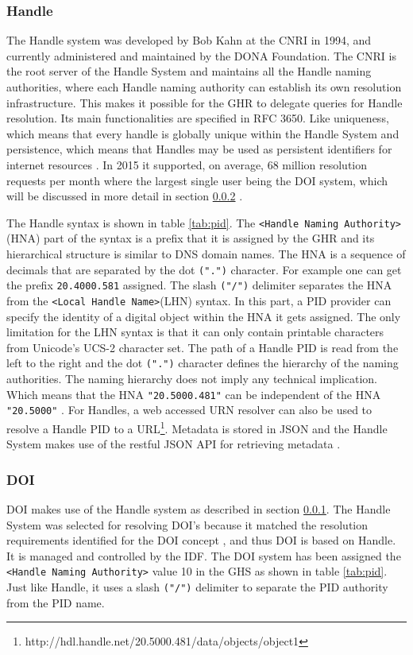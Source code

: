 \subsubsection{Handle}\label{hndl}
The Handle system was developed by Bob Kahn at the CNRI in 1994, and currently administered and maintained by the DONA Foundation. The CNRI is the root server of the Handle System and maintains all the Handle naming authorities, where each Handle naming authority can establish its own resolution infrastructure. This makes it possible for the GHR to delegate queries for Handle resolution. 
Its main functionalities are specified in RFC 3650. Like uniqueness, which means that every handle is globally unique within the Handle System and persistence, which means that Handles may be used as persistent identifiers for internet resources \cite{rfc3650}. In 2015 it supported, on average, 68 million resolution requests per month where the largest single user being the DOI system, which will be discussed in more detail in section \ref{doi} \cite{hdl-us}. 

The Handle syntax is shown in table \ref{tab:pid}. The \texttt{\textless Handle Naming Authority\textgreater} (HNA) part of the syntax is a prefix that it is assigned by the GHR and its hierarchical structure is similar to DNS domain names. The HNA is a sequence of decimals that are separated by the dot \texttt{(".")} character. For example one can get the prefix \texttt{20.4000.581} assigned. The slash \texttt{("/")} delimiter separates the HNA from the \texttt{\textless Local Handle Name\textgreater}(LHN) syntax. In this part, a PID provider can specify the identity of a digital object within the HNA it gets assigned. The only limitation for the LHN syntax is that it can only contain printable characters from Unicode's UCS-2 character set. The path of a Handle PID is read from the left to the right and the dot \texttt{(".")} character defines the hierarchy of the naming authorities. The naming hierarchy does not imply any technical implication. Which means that the HNA \texttt{"20.5000.481"} can be independent of the HNA \texttt{"20.5000"} \cite{icn-bd}. For Handles, a web accessed URN resolver can also be used to resolve a Handle PID to a URL\footnote{http://hdl.handle.net/20.5000.481/data/objects/object1}. Metadata is stored in JSON and the Handle System makes use of the restful JSON API for retrieving metadata \cite{hdl-api}.

\subsubsection{DOI}\label{doi}
DOI makes use of the Handle system as described in section \ref{hndl}. The Handle System was selected for resolving DOI's because it matched the resolution requirements identified for the DOI concept \cite{doi-found}, and thus DOI is based on Handle. It is managed and controlled by the IDF. The DOI system has been assigned the \texttt{<Handle Naming Authority>} value 10 in the GHS as shown in table \ref{tab:pid}. Just like Handle, it uses a slash \texttt{("/")} delimiter to separate the PID authority from the PID name.

